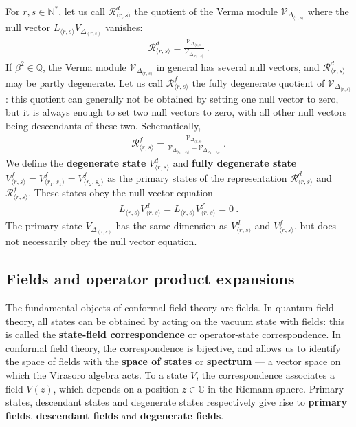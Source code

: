 \documentclass[12pt, a4paper]{article}
\theoremstyle{break}
\begin{document}
For $r,s\in\mathbb{N}^*$, let us call $\mathcal{R}^d_{\langle r,s\rangle}$ the quotient of the Verma module $\mathcal{V}_{\Delta_{\langle r,s\rangle}}$ where the null vector $L_{\langle r,s\rangle}V_{\Delta_{(r,s)}}$ vanishes:
\begin{align}
 \mathcal{R}^d_{\langle r,s\rangle} 
 =\frac{\mathcal{V}_{\Delta_{\langle r,s\rangle}}}{\mathcal{V}_{\Delta_{\langle r,-s\rangle}}}\ . 
 \label{rvv}
\end{align}
If $\beta^2\in \mathbb{Q}$, the Verma module $\mathcal{V}_{\Delta_{\langle r,s\rangle}}$ in general has several null vectors, and $\mathcal{R}^d_{\langle r,s\rangle}$ may be partly degenerate. Let us call $\mathcal{R}^f_{\langle r,s\rangle}$ the fully degenerate quotient of  $\mathcal{V}_{\Delta_{\langle r,s\rangle}}$: this quotient can generally not be obtained by setting one null vector to zero, but it is always enough to set two null vectors to zero, with all other null vectors being descendants of these two. Schematically,
\begin{align}
 \mathcal{R}^f_{\langle r,s\rangle} = \frac{\mathcal{V}_{\Delta_{\langle r,s\rangle}}}{\mathcal{V}_{\Delta_{\langle r_1,-s_1\rangle}}+ \mathcal{V}_{\Delta_{\langle r_2,-s_2\rangle}}}\ .
\end{align}
We define the \textbf{degenerate state} $V^d_{\langle r,s\rangle}$ and \textbf{fully degenerate state} $V^f_{\langle r,s\rangle}=V^f_{\langle r_1,s_1\rangle}=V^f_{\langle r_2,s_2\rangle}$ as the primary states of the representation $\mathcal{R}^d_{\langle r,s\rangle}$ and 
$\mathcal{R}^f_{\langle r,s\rangle}$. These states obey the null vector equation
\begin{align}
L_{\langle r, s\rangle} V^d_{\langle r,s\rangle} = L_{\langle r, s\rangle} V^f_{\langle r,s\rangle} = 0\ .
\label{lvdz}
\end{align}
The primary state $V_{\Delta_{(r,s)}}$ has the same dimension as $V^d_{\langle r,s\rangle}$ and $V^f_{\langle r,s\rangle}$, but does not necessarily obey the null vector equation. 

\subsection{Fields and operator product expansions}\label{sec:fope}

The fundamental objects of conformal field theory are fields. In quantum field theory, all states can be obtained by acting on the vacuum state with fields: this is called the \textbf{state-field correspondence} or operator-state correspondence. In conformal field theory, the correspondence is bijective, and allows us to identify the space of fields with the \textbf{space of states} or \textbf{spectrum}  --- a vector space on which the Virasoro algebra acts. To a state $V$, the correspondence associates a field $V(z)$, which depends on a position $z\in\overline{\mathbb{C}}$ in the Riemann sphere. Primary states, descendant states and degenerate states respectively give rise to \textbf{primary fields}, \textbf{descendant fields} and \textbf{degenerate fields}.
\end{document}
